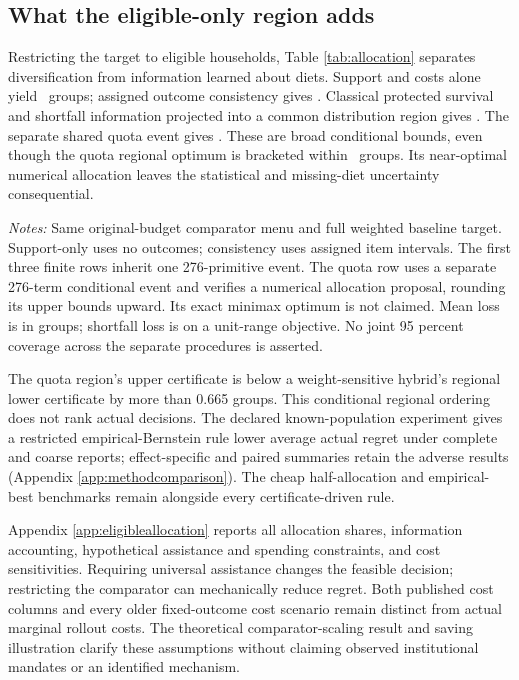 \documentclass[11pt]{article}
\begin{document}
\subsection{What the eligible-only region adds}

Restricting the target to eligible households, Table \ref{tab:allocation} separates diversification from information learned about diets. Support and costs alone yield \SupportMeanLoss\ groups; assigned outcome consistency gives \LogicalMeanLoss. Classical protected survival and shortfall information projected into a common distribution region gives \TightMeanLoss. The separate shared quota event gives \QuotaMeanLoss. These are broad conditional bounds, even though the quota regional optimum is bracketed within \QuotaRegionalMeanGap\ groups. Its near-optimal numerical allocation leaves the statistical and missing-diet uncertainty consequential.

\begin{table}[t]
\centering\caption{Eligible-only diversification and incremental outcome information}\label{tab:allocation}

\begin{minipage}{\textwidth}\footnotesize\emph{Notes:} Same original-budget comparator menu and full weighted baseline target. Support-only uses no outcomes; consistency uses assigned item intervals. The first three finite rows inherit one 276-primitive event. The quota row uses a separate 276-term conditional event and verifies a numerical allocation proposal, rounding its upper bounds upward. Its exact minimax optimum is not claimed. Mean loss is in groups; shortfall loss is on a unit-range objective. No joint 95 percent coverage across the separate procedures is asserted.\end{minipage}
\end{table}

The quota region's upper certificate is below a weight-sensitive hybrid's regional lower certificate by more than 0.665 groups. This conditional regional ordering does not rank actual decisions. The declared known-population experiment gives a restricted empirical-Bernstein rule lower average actual regret under complete and coarse reports; effect-specific and paired summaries retain the adverse results (Appendix \ref{app:methodcomparison}). The cheap half-allocation and empirical-best benchmarks remain alongside every certificate-driven rule.

Appendix \ref{app:eligibleallocation} reports all allocation shares, information accounting, hypothetical assistance and spending constraints, and cost sensitivities. Requiring universal assistance changes the feasible decision; restricting the comparator can mechanically reduce regret. Both published cost columns and every older fixed-outcome cost scenario remain distinct from actual marginal rollout costs. The theoretical comparator-scaling result and saving illustration clarify these assumptions without claiming observed institutional mandates or an identified mechanism.
\end{document}
